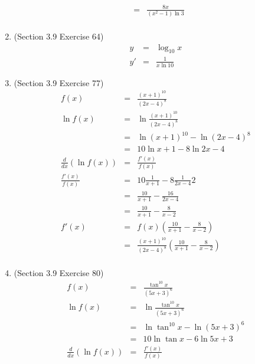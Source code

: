 \documentclass{article}
\begin{document}
\begin{enumerate}
\begin{eqnarray}
               &=& \frac{8x}{\left(x^2 - 1\right)\ln{3}} \\
        \end{eqnarray}
    \item (Section 3.9 Exercise 64)
        \begin{eqnarray}
            y &=& \log_{10}{x} \\
            y' &=& \frac{1}{x\ln{10}}
        \end{eqnarray}
    \item (Section 3.9 Exercise 77)
        \begin{eqnarray}
            f(x) &=& \frac{\left(x + 1\right)^{10}}{\left(2x - 4\right)^8} \\
            \ln{f(x)} &=& \ln{\frac{\left(x + 1\right)^{10}}{\left(2x - 4\right)^8}} \\
                      &=& \ln{\left(x + 1\right)^{10}} - \ln{\left(2x - 4\right)^8} \\
                      &=& 10\ln{x + 1} - 8\ln{2x - 4} \\
            \frac{d}{dx}\left(\ln{f\left(x\right)}\right) &=& \frac{f'(x)}{f(x)} \\
            \frac{f'(x)}{f(x)} &=& 10\frac{1}{x + 1} - 8\frac{1}{2x - 4}2 \\
                               &=& \frac{10}{x + 1} - \frac{16}{2x - 4} \\
                               &=& \frac{10}{x + 1} - \frac{8}{x - 2} \\
            f'(x) &=& f(x)\left(\frac{10}{x + 1} - \frac{8}{x - 2}\right) \\
                  &=& \frac{\left(x + 1\right)^{10}}{\left(2x - 4\right)^8}\left(\frac{10}{x + 1} - \frac{8}{x - 2}\right) \\
        \end{eqnarray}
    \item (Section 3.9 Exercise 80)
        \begin{eqnarray}
            f(x) &=& \frac{\tan^{10}x}{\left(5x + 3\right)^6} \\
            \ln{f(x)} &=& \ln{\frac{\tan^{10}x}{\left(5x + 3\right)^6}} \\
                      &=& \ln{\tan^{10}{x}} - \ln{\left(5x + 3\right)^6} \\
                      &=& 10\ln{\tan{x}} - 6\ln{5x + 3} \\
            \frac{d}{dx}\left(\ln{f\left(x\right)}\right) &=& \frac{f'(x)}{f(x)} \\

\end{eqnarray}
\end{enumerate}
\end{document}
